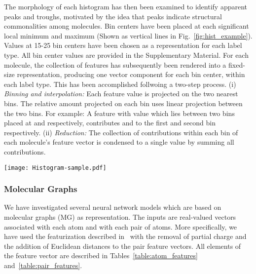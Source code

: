 \documentclass[reprint, superscriptaddress,
amsmath,amssymb, aps, prb,
]{revtex4-1}
\begin{document}
{The morphology of each histogram has then been examined to identify apparent peaks and troughs, motivated by the idea that peaks indicate structural commonalities among molecules. 
Bin centers have been placed at each significant local minimum and maximum (Shown as vertical lines in Fig.~\ref{fig:hist_example}). 
Values at 15-25 bin centers have been chosen as a representation for each label type. 
All bin center values are provided in the Supplementary Material.
For each molecule, the collection of features has subsequently been rendered into a fixed-size representation, 
producing one vector component for each bin center, within each label type. This has been accomplished follwoing a two-step process.
(i) \emph{Binning and interpolation:} Each feature value is projected on the two nearest bins.
 The relative amount projected on each bin uses linear projection between the two bins.
 For example: A feature with value  which lies between two bins placed at  and  respectively,
 contributes  and  to the first and second bin respectively.
(ii) \emph{Reduction:} The collection of contributions within each bin of each molecule's feature vector is condensed to a single value by summing all contributions. 





\begin{figure*}
 \texttt{[image: Histogram-sample.pdf]}
 \caption{ \label{fig:hist_example}
 	Illustration of select histograms of distances, angles and dihedral angles in QM9. Vertical lines constitutes placements of the bins in the HD and/or HDAD representations. (a)  All C-N distances.  (b) All C-C-C angles. (c) All C-C-C-O dihedral angles.}
\end{figure*}




















\subsubsection{Molecular Graphs}

We have investigated several neural network models which are based on molecular graphs (MG) as representation. 
The inputs are real-valued vectors associated with each atom and with each pair of atoms. 
More specifically, we have used the featurization described in~\citet{kearnes2016molecular} with the removal of partial charge and the addition of Euclidean distances to the pair feature vectors. 
All elements of the feature vector are described in Tables~\ref{table:atom_features} and~\ref{table:pair_features}. 

}
\end{document}
